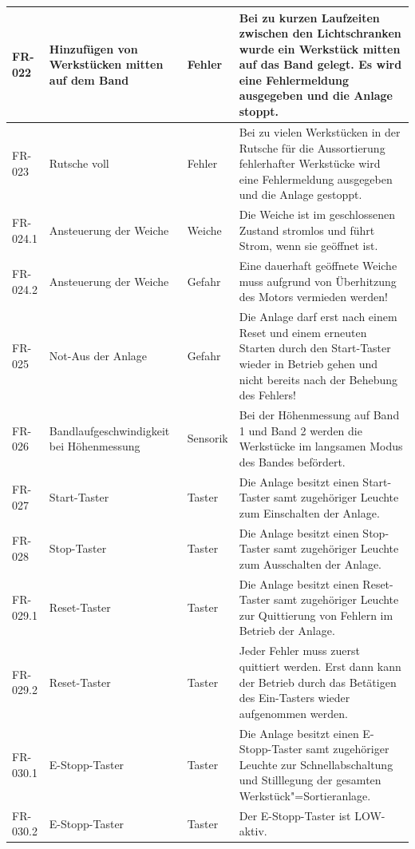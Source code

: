 \documentclass[oneside,a4paper,titlepage]{scrartcl} %
\begin{document}
\begin{small}
\begin{longtable}{|C{2cm}|L{4cm}|C{1.5cm}|L{5.5cm}|}
  \hline
   FR-022 & Hinzufügen von Werkstücken mitten auf dem Band & Fehler & Bei zu kurzen Laufzeiten zwischen den Lichtschranken wurde ein Werkstück mitten auf das Band gelegt. Es wird eine Fehlermeldung ausgegeben und die Anlage stoppt.\\
  \hline
  FR-023 & Rutsche voll & Fehler & Bei zu vielen Werkstücken in der Rutsche für die Aussortierung fehlerhafter Werkstücke wird eine Fehlermeldung ausgegeben und die Anlage gestoppt.\\
  \hline
   FR-024.1 & Ansteuerung der Weiche & Weiche & Die Weiche ist im geschlossenen Zustand stromlos und führt Strom, wenn sie geöffnet ist.\\
  \hline
   FR-024.2 & Ansteuerung der Weiche & Gefahr & Eine dauerhaft geöffnete Weiche muss aufgrund von Überhitzung des Motors vermieden werden!\\
  \hline
  FR-025 & Not-Aus der Anlage & Gefahr & Die Anlage darf erst nach einem Reset und einem erneuten Starten durch den Start-Taster wieder in Betrieb gehen und nicht bereits nach der Behebung des Fehlers!\\
  \hline
   FR-026 & Bandlaufgeschwindigkeit bei Höhenmessung & Sensorik & Bei der Höhenmessung auf Band 1 und Band 2 werden die Werkstücke im langsamen Modus des Bandes befördert.\\
  \hline
  FR-027 & Start-Taster & Taster & Die Anlage besitzt einen Start-Taster samt zugehöriger Leuchte zum Einschalten der Anlage.\\
  \hline
   FR-028 & Stop-Taster & Taster & Die Anlage besitzt einen Stop-Taster samt zugehöriger Leuchte zum Ausschalten der Anlage.\\
  \hline
  FR-029.1 & Reset-Taster & Taster & Die Anlage besitzt einen Reset-Taster samt zugehöriger Leuchte zur Quittierung von Fehlern im Betrieb der Anlage.\\
  \hline
  FR-029.2 & Reset-Taster & Taster & Jeder Fehler muss zuerst quittiert werden. Erst dann kann der Betrieb durch das Betätigen des Ein-Tasters wieder aufgenommen werden.\\
  \hline
   FR-030.1 & E-Stopp-Taster & Taster & Die Anlage besitzt einen E-Stopp-Taster samt zugehöriger Leuchte zur Schnellabschaltung und Stilllegung der gesamten Werkstück"=Sortieranlage.\\
  \hline
   FR-030.2 & E-Stopp-Taster & Taster & Der E-Stopp-Taster ist LOW-aktiv.\\
  \hline
 \end{longtable}
\end{small}
\end{document}
